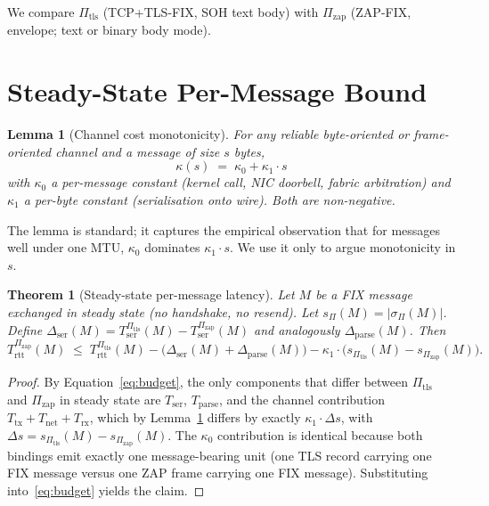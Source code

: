 \documentclass[11pt,a4paper]{article}
\newtheorem{theorem}{Theorem}
\newtheorem{lemma}{Lemma}
\begin{document}
We compare $\Pi_{\mathrm{tls}}$ (TCP+TLS-FIX, SOH text body) with
$\Pi_{\mathrm{zap}}$ (ZAP-FIX, envelope; text or binary body
mode).

\section{Steady-State Per-Message Bound}
\label{sec:steady}

\begin{lemma}[Channel cost monotonicity]
\label{lem:channel}
For any reliable byte-oriented or frame-oriented channel and a
message of size $s$ bytes,
\[
  \kappa(s) \;=\; \kappa_0 + \kappa_1 \cdot s
\]
with $\kappa_0$ a per-message constant (kernel call, NIC doorbell,
fabric arbitration) and $\kappa_1$ a per-byte constant
(serialisation onto wire). Both are non-negative.
\end{lemma}

The lemma is standard; it captures the empirical observation that
for messages well under one MTU, $\kappa_0$ dominates $\kappa_1
\cdot s$. We use it only to argue monotonicity in $s$.

\begin{theorem}[Steady-state per-message latency]
\label{thm:steady}
Let $M$ be a FIX message exchanged in steady state (no handshake,
no resend). Let $s_\Pi(M) = |\sigma_\Pi(M)|$. Define
$\Delta_{\mathrm{ser}}(M) = T_{\mathrm{ser}}^{\Pi_{\mathrm{tls}}}(M)
- T_{\mathrm{ser}}^{\Pi_{\mathrm{zap}}}(M)$ and analogously
$\Delta_{\mathrm{parse}}(M)$. Then
\[
  T_{\mathrm{rtt}}^{\Pi_{\mathrm{zap}}}(M)
  \;\leq\;
  T_{\mathrm{rtt}}^{\Pi_{\mathrm{tls}}}(M)
  - \big(\Delta_{\mathrm{ser}}(M) + \Delta_{\mathrm{parse}}(M)\big)
  - \kappa_1 \cdot \big(s_{\Pi_{\mathrm{tls}}}(M)
                        - s_{\Pi_{\mathrm{zap}}}(M)\big).
\]
\end{theorem}

\begin{proof}
By Equation~\eqref{eq:budget}, the only components that differ
between $\Pi_{\mathrm{tls}}$ and $\Pi_{\mathrm{zap}}$ in steady
state are $T_{\mathrm{ser}}$, $T_{\mathrm{parse}}$, and the channel
contribution $T_{\mathrm{tx}} + T_{\mathrm{net}} + T_{\mathrm{rx}}$,
which by Lemma~\ref{lem:channel} differs by exactly $\kappa_1
\cdot \Delta s$, with $\Delta s =
s_{\Pi_{\mathrm{tls}}}(M) - s_{\Pi_{\mathrm{zap}}}(M)$. The
$\kappa_0$ contribution is identical because both bindings emit
exactly one message-bearing unit (one TLS record carrying one FIX
message versus one ZAP frame carrying one FIX message). Substituting
into~\eqref{eq:budget} yields the claim.
\end{proof}
\end{document}

